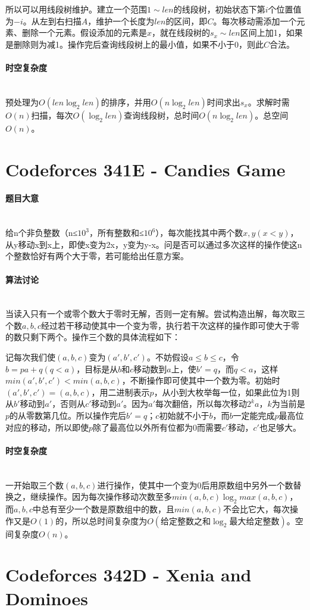 \documentclass[UTF8]{ctexart}
\newcommand{\myparagraph}[1]{\paragraph{#1}\mbox{}\\}
\theoremstyle{nonumberplain}
\begin{document}
			所以可以用线段树维护。建立一个范围$1 \sim len$的线段树，初始状态下第$i$个位置值为$-i$。从左到右扫描$A$，维护一个长度为$len$的区间，即$C$。每次移动需添加一个元素、删除一个元素。假设添加的元素是$x$，就在线段树的$s_x \sim len$区间上加1，如果是删除则为减1。操作完后查询线段树上的最小值，如果不小于0，则此$C$合法。
		
		\myparagraph{时空复杂度}
		
			预处理为$O(len\log_2len)$的排序，并用$O(n\log_2len)$时间求出$s_x$。求解时需$O(n)$扫描，每次$O(\log_2len)$查询线段树，总时间$O(n\log_2len)$。总空间$O(n)$。
	
	\section{Codeforces 341E - Candies Game}
		
		\myparagraph{题目大意}
			
			给n个非负整数（n≤$10^3$，所有整数和≤$10^6$），每次能找其中两个数$x,y(x<y)$，从y移动x到x上，即使x变为2x，y变为y-x。问是否可以通过多次这样的操作使这n个整数恰好有两个大于零，若可能给出任意方案。
			
		\myparagraph{算法讨论}
		
			当读入只有一个或零个数大于零时无解，否则一定有解。尝试构造出解，每次取三个数$a,b,c$经过若干移动使其中一个变为零，执行若干次这样的操作即可使大于零的数只剩下两个。操作三个数的具体流程如下：
			
			记每次我们使$(a,b,c)$变为$(a',b',c')$。不妨假设$a \leq b \leq c$，令$b=pa+q(q<a)$，目标是从$b$和$c$移动数到$a$上，使$b'=q$，而$q<a$，这样$min(a',b',c')<min(a,b,c)$，不断操作即可使其中一个数为零。初始时$(a',b',c')=(a,b,c)$，用二进制表示$p$，从小到大枚举每一位，如果此位为1则从$b'$移动到$a'$，否则从$c'$移动到$a'$。因为$a'$每次翻倍，所以每次移动$2^k a$，$k$为当前是$p$的从零数第几位。所以操作完后$b'=q$；$c$初始就不小于$b$，而$b$一定能完成$p$最高位对应的移动，所以即使$p$除了最高位以外所有位都为0而需要$c'$移动，$c'$也足够大。
		
		\myparagraph{时空复杂度}
		
			一开始取三个数$(a,b,c)$进行操作，使其中一个变为0后用原数组中另外一个数替换之，继续操作。因为每次操作移动次数至多$min(a,b,c)\log_2max(a,b,c)$，而$a,b,c$中总有至少一个数是原数组中的数，且$min(a,b,c)$不会比它大，每次操作又是$O(1)$的，所以总时间复杂度为$O(\mbox{给定整数之和}\log_2\mbox{最大给定整数})$。空间复杂度$O(n)$。
	
	\section{Codeforces 342D - Xenia and Dominoes}
	
\end{document}
